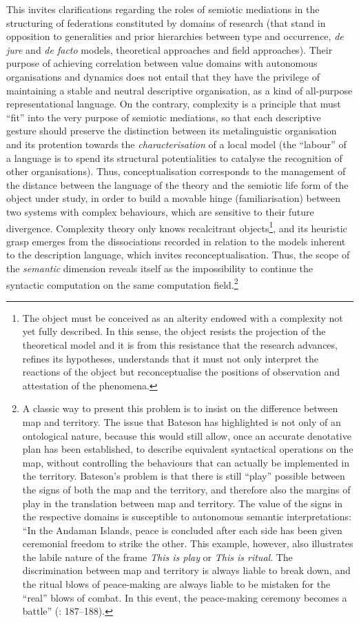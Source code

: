 \documentclass[output=paper]{langscibook}
\begin{document}
This invites clarifications regarding the roles of semiotic mediations in the structuring of federations constituted by domains of research (that stand in opposition to generalities and prior hierarchies between type and occurrence, \textit{de jure} and \textit{de facto} models, theoretical approaches and field approaches). Their purpose of achieving correlation between value domains with autonomous organisations and dynamics does not entail that they have the privilege of maintaining a stable and neutral descriptive organisation, as a kind of all-purpose representational language. On the contrary, complexity is a principle that must “fit” into the very purpose of semiotic mediations, so that each descriptive gesture should preserve the distinction between its metalinguistic organisation and its protention towards the \textit{characterisation} of a local model (the “labour” of a language is to spend its structural potentialities to catalyse the recognition of other organisations). Thus, conceptualisation corresponds to the management of the distance between the language of the theory and the semiotic life form of the object under study, in order to build a movable hinge (familiarisation) between two systems with complex behaviours, which are sensitive to their future divergence. Complexity theory only knows recalcitrant objects\footnote{The object must be conceived as an alterity endowed with a complexity not yet fully described. In this sense, the object resists the projection of the theoretical model and it is from this resistance that the research advances, refines its hypotheses, understands that it must not only interpret the reactions of the object but reconceptualise the positions of observation and attestation of the phenomena.}, and its heuristic grasp emerges from the dissociations recorded in relation to the models inherent to the description language, which invites reconceptualisation. Thus, the scope of the \textit{semantic} dimension reveals itself as the impossibility to continue the syntactic computation on the same computation field.\footnote{A classic way to present this problem is to insist on the difference between map and territory. The issue that Bateson has highlighted is not only of an ontological nature, because this would still allow, once an accurate denotative plan has been established, to describe equivalent syntactical operations on the map, without controlling the behaviours that can actually be implemented in the territory. Bateson's problem is that there is still “play” possible between the signs of both the map and the territory, and therefore also the margins of play in the translation between map and territory. The value of the signs in the respective domains is susceptible to autonomous semantic interpretations: “In the Andaman Islands, peace is concluded after each side has been given ceremonial freedom to strike the other. This example, however, also illustrates the labile nature of the frame \textit{This is play} or \textit{This is ritual}. The discrimination between map and territory is always liable to break down, and the ritual blows of peace-making are always liable to be mistaken for the ``real'' blows of combat. In this event, the peace-making ceremony becomes a battle” (\citealt{Bateson1971}: 187--188).}
\end{document}
